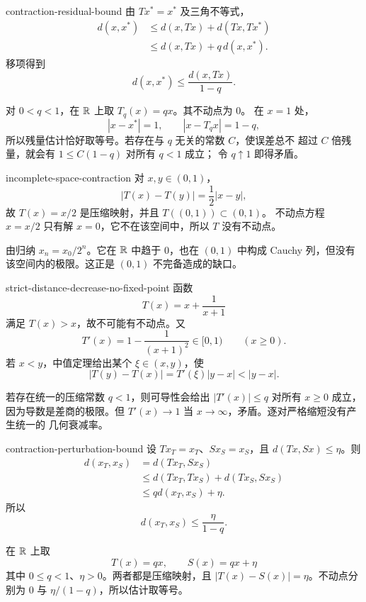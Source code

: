 \begin{solution}{contraction-residual-bound}
由 \(Tx^\ast=x^\ast\) 及三角不等式，
\[
\begin{aligned}
 d(x,x^\ast)
 &\le d(x,Tx)+d(Tx,Tx^\ast)\\
 &\le d(x,Tx)+q\,d(x,x^\ast).
\end{aligned}
\]
移项得到
\[
 d(x,x^\ast)\le\frac{d(x,Tx)}{1-q}.
\]

对 \(0<q<1\)，在 \(\mathbb{R}\) 上取 \(T_q(x)=qx\)。其不动点为 \(0\)。
在 \(x=1\) 处，
\[
 |x-x^\ast|=1,\qquad |x-T_qx|=1-q,
\]
所以残量估计恰好取等号。若存在与 \(q\) 无关的常数 \(C\)，使误差总不
超过 \(C\) 倍残量，就会有 \(1\le C(1-q)\) 对所有 \(q<1\) 成立；
令 \(q\uparrow1\) 即得矛盾。
\end{solution}

\begin{solution}{incomplete-space-contraction}
对 \(x,y\in(0,1)\)，
\[
 |T(x)-T(y)|=\frac12|x-y|,
\]
故 \(T(x)=x/2\) 是压缩映射，并且 \(T((0,1))\subset(0,1)\)。
不动点方程 \(x=x/2\) 只有解 \(x=0\)，它不在该空间中，所以 \(T\)
没有不动点。

由归纳 \(x_n=x_0/2^n\)。它在 \(\mathbb{R}\) 中趋于 \(0\)，也在
\((0,1)\) 中构成 Cauchy 列，但没有该空间内的极限。这正是
\((0,1)\) 不完备造成的缺口。
\end{solution}

\begin{solution}{strict-distance-decrease-no-fixed-point}
函数
\[
 T(x)=x+\frac1{x+1}
\]
满足 \(T(x)>x\)，故不可能有不动点。又
\[
 T'(x)=1-\frac1{(x+1)^2}\in[0,1)
\qquad(x\ge0).
\]
若 \(x<y\)，中值定理给出某个 \(\xi\in(x,y)\)，使
\[
 |T(y)-T(x)|=T'(\xi)|y-x|<|y-x|.
\]

若存在统一的压缩常数 \(q<1\)，则可导性会给出
\(|T'(x)|\le q\) 对所有 \(x\ge0\) 成立，因为导数是差商的极限。但
\(T'(x)\to1\) 当 \(x\to\infty\)，矛盾。逐对严格缩短没有产生统一的
几何衰减率。
\end{solution}

\begin{solution}{contraction-perturbation-bound}
设 \(Tx_T=x_T\)、\(Sx_S=x_S\)，且
\(d(Tx,Sx)\le\eta\)。则
\[
\begin{aligned}
 d(x_T,x_S)
 &=d(Tx_T,Sx_S)\\
 &\le d(Tx_T,Tx_S)+d(Tx_S,Sx_S)\\
 &\le qd(x_T,x_S)+\eta.
\end{aligned}
\]
所以
\[
 d(x_T,x_S)\le\frac{\eta}{1-q}.
\]

在 \(\mathbb{R}\) 上取
\[
 T(x)=qx,\qquad S(x)=qx+\eta
\]
其中 \(0\le q<1\)、\(\eta>0\)。两者都是压缩映射，且
\(|T(x)-S(x)|=\eta\)。不动点分别为 \(0\) 与
\(\eta/(1-q)\)，所以估计取等号。
\end{solution}

